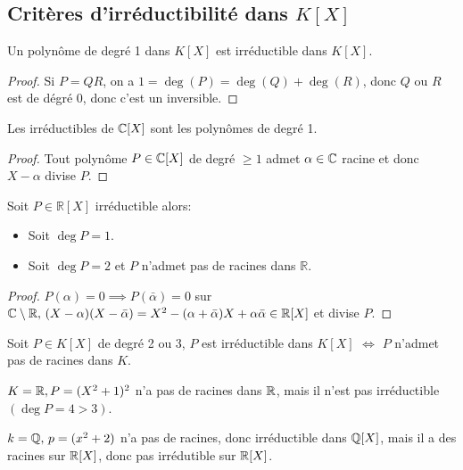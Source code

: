 \subsection{Critères d'irréductibilité dans $K[X]$}

\begin{prop}
	Un polynôme de degré 1 dans $K[X]$ est irréductible dans $K[X]$.
\end{prop}

\begin{proof}
	Si $P = QR$, on a $ 1 = \deg(P) = \deg(Q) + \deg(R)$, donc $Q$ ou $R$ est de dégré 0, donc c'est un inversible.
\end{proof}

\begin{theorem}
	Les irréductibles de $\mathbb{C}[X]$ sont les polynômes de degré 1.
\end{theorem}

\begin{proof}
	Tout polynôme $P\in \mathbb{C}[X]$ de degré $\geq 1$ admet $\alpha \in \mathbb{C}$ racine et donc $X-\alpha$ divise $P$.
\end{proof}

\begin{prop}
	Soit $P \in \mathbb{R}[X]$ irréductible alors:
	\begin{itemize}
		\item Soit $\deg P = 1$.
		\item Soit $\deg P = 2$ et $P$ n'admet pas de racines dans $\mathbb{R}$.
	\end{itemize}
\end{prop}

\begin{proof}
	$P(\alpha) = 0 \implies P(\bar{\alpha}) = 0$
	sur $\mathbb{C} \setminus \mathbb{R}, \, (X- \alpha) (X- \bar{\alpha}) = X ^2 - (\alpha + \bar{\alpha})X +
		\alpha\bar{\alpha} \in \mathbb{R}[X]$
	et divise $P$.
\end{proof}

\begin{prop}
	Soit $P \in K[X]$ de degré 2 ou 3,
	$P$ est irréductible dans $K[X]$ $\iff$ $P$ n'admet pas de racines dans $K$.
\end{prop}

\begin{example}
	$K = \mathbb{R}, P = (X^2 + 1 )^2$ n'a pas de racines dans $\mathbb{R}$, mais il n'est pas irréductible $(\deg P = 4 > 3)$.
\end{example}

\begin{example}
	$k = \mathbb{Q}, \,p = (x^2 + 2 )$ n'a pas de racines, donc irréductible dans $\mathbb{Q}[X]$, mais il a des racines sur $\mathbb{R}[X]$, donc pas irrédutible sur $\mathbb{R}[X]$.
\end{example}

